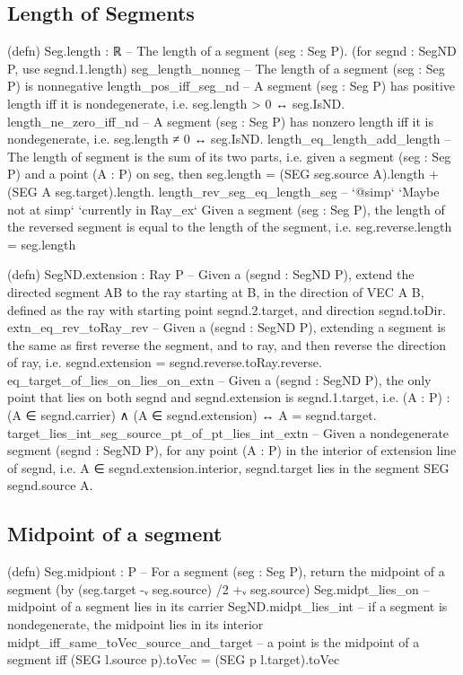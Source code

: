 \documentclass[12pt,a4paper]{article}
\begin{document}
\subsection{Length of Segments}

    (defn) Seg.length : ℝ -- The length of a segment (seg : Seg P).  (for segnd : SegND P, use segnd.1.length)
    seg_length_nonneg -- The length of a segment (seg : Seg P) is nonnegative
    length_pos_iff_seg_nd -- A segment (seg : Seg P) has positive length iff it is nondegenerate, i.e. seg.length > 0 ↔ seg.IsND.
    length_ne_zero_iff_nd -- A segment (seg : Seg P) has nonzero length iff it is nondegenerate, i.e. seg.length ≠ 0 ↔ seg.IsND.
    length_eq_length_add_length -- The length of segment is the sum of its two parts, i.e. given a segment (seg : Seg P) and a point (A : P) on seg, then seg.length = (SEG seg.source A).length + (SEG A seg.target).length.
    length_rev_seg_eq_length_seg -- `@simp` `Maybe not at simp` `currently in Ray_ex` Given a segment (seg : Seg P), the length of the reversed segment is equal to the length of the segment, i.e. seg.reverse.length = seg.length

    (defn) SegND.extension : Ray P -- Given a (segnd : SegND P), extend the directed segment AB to the ray starting at B, in the direction of VEC A B, defined as the ray with starting point segnd.2.target, and direction segnd.toDir.
    extn_eq_rev_toRay_rev -- Given a (segnd : SegND P), extending a segment is the same as first reverse the segment, and to ray, and then reverse the direction of ray, i.e. segnd.extension = segnd.reverse.toRay.reverse.
    eq_target_of_lies_on_lies_on_extn -- Given a (segnd : SegND P), the only point that lies on both segnd and segnd.extension is segnd.1.target, i.e. (A : P) : (A ∈ segnd.carrier) ∧ (A ∈ segnd.extension) ↔ A = segnd.target.
    target_lies_int_seg_source_pt_of_pt_lies_int_extn -- Given a nondegenerate segment (segnd : SegND P), for any point (A : P) in the interior of extension line of segnd, i.e. A ∈ segnd.extension.interior, segnd.target lies in the segment SEG segnd.source A.


\subsection{Midpoint of a segment}

    (defn) Seg.midpiont : P -- For a segment (seg : Seg P), return the midpoint of a segment (by (seg.target -ᵥ seg.source) /2 +ᵥ seg.source)
    Seg.midpt_lies_on -- midpoint of a segment lies in its carrier
    SegND.midpt_lies_int -- if a segment is nondegenerate, the midpoint lies in its interior
    midpt_iff_same_toVec_source_and_target -- a point is the midpoint of a segment iff (SEG l.source p).toVec = (SEG p l.target).toVec
    
\end{document}

